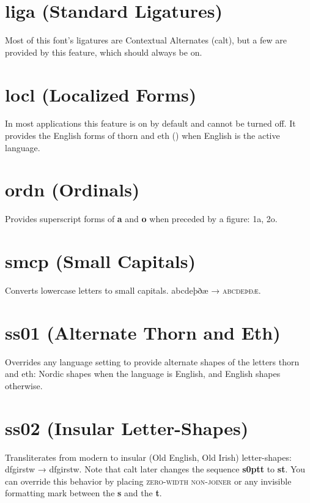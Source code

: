 \documentclass[12pt,letterpaper,openany]{book}
\begin{document}
\section{liga (Standard Ligatures)}
Most of this font’s ligatures are Contextual Alternates (calt), but a few
are provided by this feature, which should always be on.

\section{locl (Localized Forms)}
In most applications this feature is on by default and cannot be turned off.
It provides the English forms of thorn and eth
(\textbf{}) when English is the
active language.

\section{ordn (Ordinals)}
Provides superscript forms of \textbf{a} and \textbf{o} when preceded by a figure:
{ 1a, 2o}.

\section{smcp (Small Capitals)}
Converts lowercase letters to small capitals. abcdeþðæ → \textsc{abcdeþðæ}.

\section{ss01 (Alternate Thorn and Eth)}
Overrides any language setting to provide alternate shapes of the letters thorn and eth: Nordic shapes when the language is English, and English shapes otherwise.

\section{ss02 (Insular Letter-Shapes)}
Transliterates from modern to insular (Old English, Old Irish) letter-shapes:\linebreak
dfgirstw → { dfgirstw}. Note that calt later
changes the sequence \textbf{ s\kern0ptt}
to \textbf{ st}. You can override this behavior by placing
 \textsc{zero-width non-joiner} or any invisible formatting mark
between the \textbf{s} and the \textbf{t}.
\end{document}
